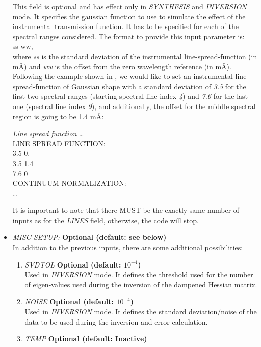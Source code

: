 \begin{itemize}
  This field is optional and has effect only in {\it SYNTHESIS} and {\it INVERSION} mode. It specifies the gaussian function to use to simulate the effect of the instrumental transmission function. It has to be specified for each of the spectral ranges considered. The format to provide this input parameter is:\\
  ss  ww,\\
  where {\it ss} is the standard deviation of the instrumental line-spread-function (in m{\AA}) and {\it ww} is the offset from the zero wavelength reference (in m{\AA}). Following the example shown in , we would like to set an instrumental line-spread-function of Gaussian shape with a standard deviation of {\it 3.5} for the first two spectral ranges (starting spectral line index {\it 4}) and {\it 7.6} for the last one (spectral line index {\it 9}), and additionally, the offset for the middle spectral region is going to be 1.4 m{\AA}:\\
\begin{ifbox}[label={tb:line_spread_function}]{{\it Line spread function}}
  \scriptsize
  \ldots\\
  LINE SPREAD FUNCTION:\\
  3.5 0.\\
  3.5 1.4\\
  7.6 0\\
  CONTINUUM NORMALIZATION:\\
  \ldots
  \normalsize
\end{ifbox}
  It is important to note that there MUST be the exactly same number of inputs as for the {\it LINES} field, otherwise, the code will stop.
  \item {\it MISC SETUP:} {\bf Optional (default: see below)}\\
  In addition to the previous inputs, there are some additional possibilities:
  \begin{enumerate}
    \item {\it SVDTOL} {\bf Optional (default: $10^{-4}$)}\\
    Used in {\it INVERSION} mode. It defines the threshold used for the number of eigen-values used during the inversion of the dampened Hessian matrix.
    \item {\it NOISE} {\bf Optional (default: $10^{-4}$)}\\
    Used in {\it INVERSION} mode. It defines the standard deviation/noise of the data to be used during the inversion and error calculation.
    \item {\it TEMP} {\bf Optional (default: Inactive)}\\

\end{enumerate}
\end{itemize}
